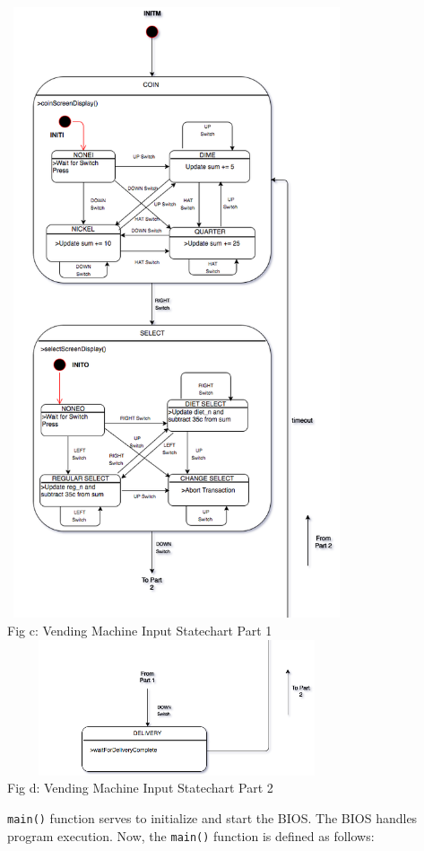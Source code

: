 \documentclass{article}
\begin{document}
\begin{itemize}
\begin{center}
\includegraphics[width=10cm, height=18cm]{VendingMachineInput1}
\\ {\small Fig c: Vending Machine Input Statechart Part 1}
\includegraphics[width=10cm, height=4cm]{vendingMachineInput2}
\\ {\small Fig d: Vending Machine Input Statechart Part 2}
\end{center}
\end{itemize}
\qquad \texttt{main()} function serves to initialize and start the BIOS. The BIOS handles program execution. Now, the \texttt{main()} function is defined as follows:
\end{document}
